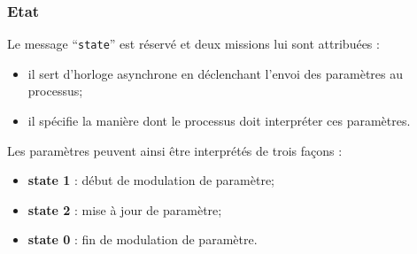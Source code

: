 \subsubsection{Etat}

\noindent Le message ``\verb|state|'' est réservé et deux missions lui sont attribuées :
\vspace{-1em}
\begin{itemize}[noitemsep]
	\item il sert d'horloge asynchrone en déclenchant l'envoi des paramètres au processus;
	\item il spécifie la manière dont le processus doit interpréter ces paramètres.
\end{itemize}

\noindent Les paramètres peuvent ainsi être interprétés de trois façons :

\vspace{-1em}
\begin{itemize}[noitemsep]
	\item \textbf{state 1} : début de modulation de paramètre;
	\item \textbf{state 2} : mise à jour de paramètre;
	\item \textbf{state 0} : fin de modulation de paramètre.	
\end{itemize}

